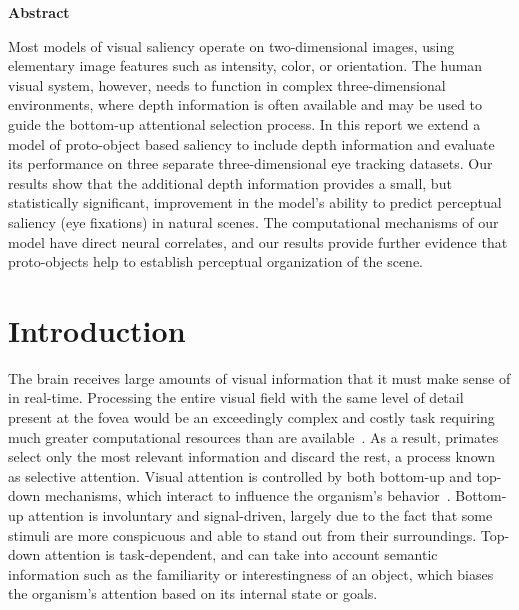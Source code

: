 \documentclass[12pt]{article}
\begin{document}

\begin{center} {\bf Abstract} \end{center}
Most models of visual saliency operate on two-dimensional  images,
using elementary image features such as intensity, color, or
orientation. The human visual system, however, needs to function in complex
three-dimensional environments, where depth information is often
available and may be used to guide the bottom-up attentional selection
process. In this report we extend a model of proto-object based
saliency to include depth information and evaluate its performance on
three separate three-dimensional eye tracking datasets. Our results show that the
additional depth information provides a small, but statistically
significant, improvement in the model's ability to predict perceptual
saliency (eye fixations) in natural scenes. The computational
mechanisms of our model have direct neural correlates, and our results
provide further evidence that proto-objects help to establish
perceptual organization of the scene.

\clearpage

\section{Introduction}
The brain receives large amounts of visual information that it must
make sense of in real-time. Processing the entire visual field with
the same level of detail present at the fovea would be an
exceedingly complex and costly task requiring much
greater computational resources than are
available~\citep{Tsotsos90}. As a result, primates select only the
most relevant information and discard the rest, a process known as
selective attention. Visual attention is controlled by both bottom-up
and top-down mechanisms, which interact to influence the organism's
behavior~\citep{Yarbus67}. Bottom-up attention is involuntary and
signal-driven, largely due to the fact that some stimuli are more
conspicuous and able to stand out from their surroundings. Top-down
attention is task-dependent, and can take into account semantic
information such as the familiarity or interestingness of an object,
which biases the organism's attention based on its internal state or
goals.
\end{document}
